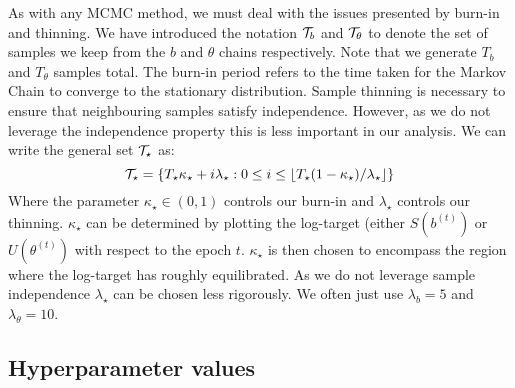 As with any MCMC method, we must deal with the issues presented by burn-in and thinning. We have introduced the notation $\mathcal{T}_b$ and $\mathcal{T}_\theta$ to denote the set of samples we keep from the $b$ and $\theta$ chains respectively. Note that we generate $T_b$ and $T_\theta$ samples total. The burn-in period refers to the time taken for the Markov Chain to converge to the stationary distribution. Sample thinning is necessary to ensure that neighbouring samples satisfy independence. However, as we do not leverage the independence property this is less important in our analysis. We can write the general set $\mathcal{T}_\star$ as:
%
\begin{equation}
	\mathcal{T}_\star = \{T_\star \kappa_\star + i \lambda_\star :  
	0 \leq i \leq \lfloor T_\star(1 - \kappa_\star) / \lambda_\star \rfloor \}
\end{equation}
%
Where the parameter $\kappa_\star \in (0, 1)$ controls our burn-in and $\lambda_\star$ controls our thinning. $\kappa_\star$ can be determined by plotting the log-target (either $S(b^{(t)})$ or $U(\theta^{(t)})$ with respect to the epoch $t$. $\kappa_\star$ is then chosen to encompass the region where the log-target has roughly equilibrated. As we do not leverage sample independence $\lambda_\star$ can be chosen less rigorously. We often just use $\lambda_b=5$ and $\lambda_\theta = 10$.

\subsection{Hyperparameter values}
\label{appdx:hyperparams}

\begin{table}[!h]
	\centering
	\caption{Hyper-parameter values for each experiment}
	\label{tab:hyperparams}
\end{table}

